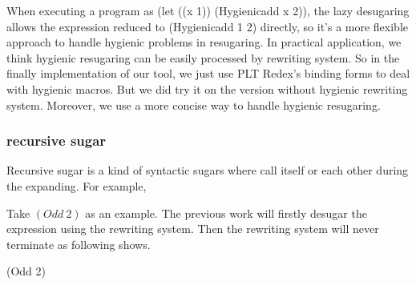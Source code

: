 When executing a program as (let ((x 1)) (Hygienicadd x 2)), the lazy desugaring allows the expression reduced to (Hygienicadd 1 2) directly, so it's a more flexible approach to handle hygienic problems in resugaring.
In practical application, we think hygienic resugaring can be easily processed by rewriting system. So in the finally implementation of our tool, we just use PLT Redex's binding forms to deal with hygienic macros. But we did try it on the version without hygienic rewriting system. Moreover, we use a more concise way to handle hygienic resugaring.

\subsubsection{recursive sugar}
Recursive sugar is a kind of syntactic sugars where call itself or each other during the expanding. For example,

Take $(Odd~2)$ as an example. The previous work will firstly desugar the expression using the rewriting system. Then the rewriting system will never terminate as following shows.
\begin{Codes}
   (Odd 2)
\end{Codes}
				

